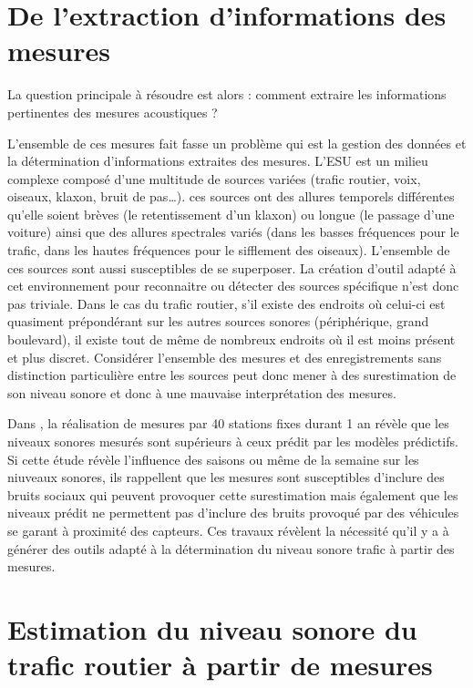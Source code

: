 \section{De l'extraction d'informations des mesures}

La question principale à résoudre est alors : comment extraire les informations pertinentes des mesures acoustiques ?

L'ensemble de ces mesures fait fasse un problème qui est la gestion des données et la détermination d'informations extraites des mesures. L'ESU est un milieu complexe composé d'une multitude de sources variées (trafic routier, voix, oiseaux, klaxon, bruit de pas\dots). ces sources ont des allures temporels différentes qu'elle soient brèves (le retentissement d'un klaxon) ou longue (le passage d'une voiture) ainsi que des allures spectrales variés (dans les basses fréquences pour le trafic, dans les hautes fréquences pour le sifflement des oiseaux). L'ensemble de ces sources sont aussi susceptibles de se superposer. La création d'outil adapté à cet environnement pour reconnaitre ou détecter des sources spécifique n'est donc pas triviale. Dans le cas du trafic routier, s'il existe des endroits où celui-ci est quasiment prépondérant sur les autres sources sonores (périphérique, grand boulevard), il existe tout de même de nombreux endroits où il est moins présent et plus discret.
Considérer l'ensemble des mesures et des enregistrements sans distinction particulière entre les sources peut donc mener à des surestimation de son niveau sonore et donc à une mauvaise interprétation des mesures. 

Dans \cite{Mioduszewski}, la réalisation de mesures par 40 stations fixes durant 1 an révèle que les niveaux sonores mesurés sont supérieurs à ceux prédit par les modèles prédictifs. Si cette étude révèle l'influence des saisons ou même de la semaine sur les niuveaux sonores, ils rappellent que les mesures sont susceptibles d'inclure des bruits \og sociaux \fg{} qui peuvent provoquer cette surestimation mais également que les niveaux prédit ne permettent pas d'inclure des bruits provoqué par des véhicules se garant à proximité des capteurs. Ces travaux révèlent la nécessité qu'il y a à générer des outils adapté à la détermination du niveau sonore trafic à partir des mesures. 


\section{Estimation du niveau sonore du trafic routier à partir de mesures}

